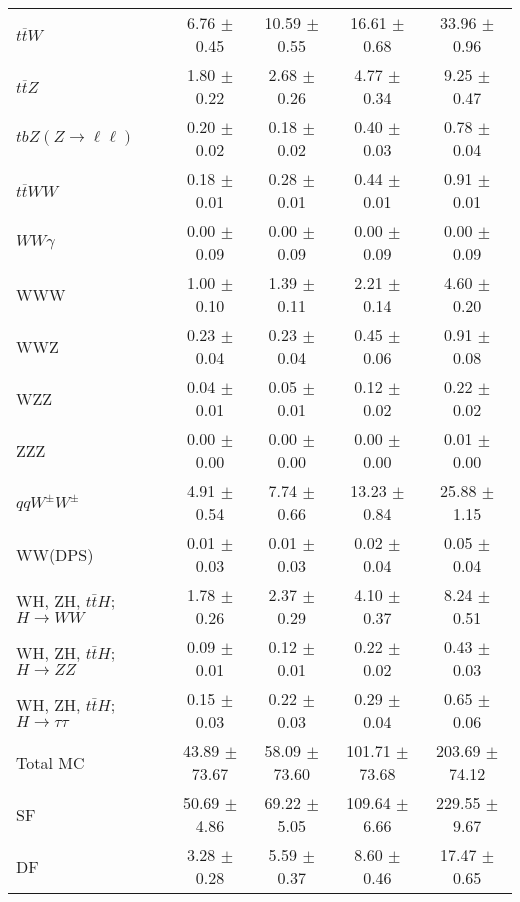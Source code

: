 \begin{tabular}{l|cccc}
                   $t\overline{t}W$ &  6.76 $\pm$  0.45 & 10.59 $\pm$  0.55 & 16.61 $\pm$  0.68 & 33.96 $\pm$  0.96 \\
                   $t\overline{t}Z$ &  1.80 $\pm$  0.22 &  2.68 $\pm$  0.26 &  4.77 $\pm$  0.34 &  9.25 $\pm$  0.47 \\
    $tbZ (Z \rightarrow \ell \ell)$ &  0.20 $\pm$  0.02 &  0.18 $\pm$  0.02 &  0.40 $\pm$  0.03 &  0.78 $\pm$  0.04 \\
                  $t\overline{t}WW$ &  0.18 $\pm$  0.01 &  0.28 $\pm$  0.01 &  0.44 $\pm$  0.01 &  0.91 $\pm$  0.01 \\
                         $WW\gamma$ &  0.00 $\pm$  0.09 &  0.00 $\pm$  0.09 &  0.00 $\pm$  0.09 &  0.00 $\pm$  0.09 \\
                                WWW &  1.00 $\pm$  0.10 &  1.39 $\pm$  0.11 &  2.21 $\pm$  0.14 &  4.60 $\pm$  0.20 \\
                                WWZ &  0.23 $\pm$  0.04 &  0.23 $\pm$  0.04 &  0.45 $\pm$  0.06 &  0.91 $\pm$  0.08 \\
                                WZZ &  0.04 $\pm$  0.01 &  0.05 $\pm$  0.01 &  0.12 $\pm$  0.02 &  0.22 $\pm$  0.02 \\
                                ZZZ &  0.00 $\pm$  0.00 &  0.00 $\pm$  0.00 &  0.00 $\pm$  0.00 &  0.01 $\pm$  0.00 \\
                 $qqW^{\pm}W^{\pm}$ &  4.91 $\pm$  0.54 &  7.74 $\pm$  0.66 & 13.23 $\pm$  0.84 & 25.88 $\pm$  1.15 \\
                            WW(DPS) &  0.01 $\pm$  0.03 &  0.01 $\pm$  0.03 &  0.02 $\pm$  0.04 &  0.05 $\pm$  0.04 \\
WH, ZH, $t\bar{t}H$; $H \rightarrow WW$ &  1.78 $\pm$  0.26 &  2.37 $\pm$  0.29 &  4.10 $\pm$  0.37 &  8.24 $\pm$  0.51 \\
WH, ZH, $t\bar{t}H$; $H \rightarrow ZZ$ &  0.09 $\pm$  0.01 &  0.12 $\pm$  0.01 &  0.22 $\pm$  0.02 &  0.43 $\pm$  0.03 \\
WH, ZH, $t\bar{t}H$; $H \rightarrow \tau\tau$ &  0.15 $\pm$  0.03 &  0.22 $\pm$  0.03 &  0.29 $\pm$  0.04 &  0.65 $\pm$  0.06 \\
\hline\hline
                           Total MC & 43.89 $\pm$ 73.67 & 58.09 $\pm$ 73.60 & 101.71 $\pm$ 73.68 & 203.69 $\pm$ 74.12 \\
\hline
                                 SF & 50.69 $\pm$  4.86 & 69.22 $\pm$  5.05 & 109.64 $\pm$  6.66 & 229.55 $\pm$  9.67 \\
                                 DF &  3.28 $\pm$  0.28 &  5.59 $\pm$  0.37 &  8.60 $\pm$  0.46 & 17.47 $\pm$  0.65 \\

\end{tabular}
